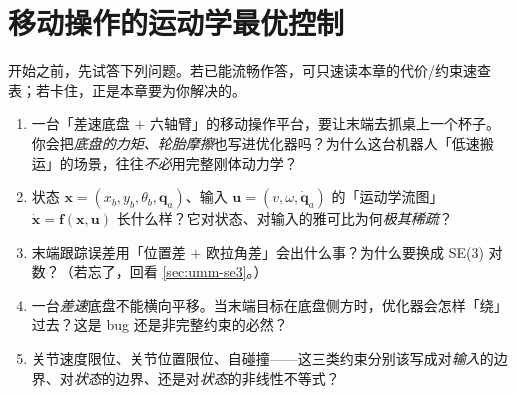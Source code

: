 \chapter{移动操作的运动学最优控制}
\label{ch:mm-ocp}


\begin{practice}[前置自测]
开始之前，先试答下列问题。若已能流畅作答，可只速读本章的代价/约束速查表；若卡住，正是本章要为你解决的。
\begin{enumerate}
  \item 一台「差速底盘 $+$ 六轴臂」的移动操作平台，要让末端去抓桌上一个杯子。你会把\emph{底盘的力矩、轮胎摩擦}也写进优化器吗？为什么这台机器人「低速搬运」的场景，往往\emph{不必}用完整刚体动力学？
  \item 状态 $\mathbf x=(x_b,y_b,\theta_b,\mathbf q_a)$、输入 $\mathbf u=(v,\omega,\dot{\mathbf q}_a)$ 的「运动学流图」$\dot{\mathbf x}=\mathbf f(\mathbf x,\mathbf u)$ 长什么样？它对状态、对输入的雅可比为何\emph{极其稀疏}？
  \item 末端跟踪误差用「位置差 $+$ 欧拉角差」会出什么事？为什么要换成 SE(3) 对数？（若忘了，回看 \cref{sec:umm-se3}。）
  \item 一台\emph{差速}底盘不能横向平移。当末端目标在底盘侧方时，优化器会怎样「绕」过去？这是 bug 还是非完整约束的必然？
  \item 关节速度限位、关节位置限位、自碰撞——这三类约束分别该写成对\emph{输入}的边界、对\emph{状态}的边界、还是对\emph{状态}的非线性不等式？
\end{enumerate}
\end{practice}


